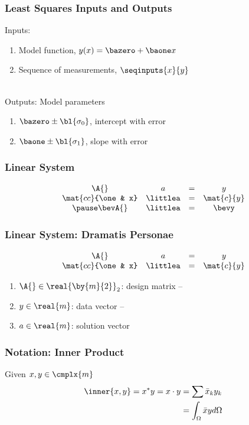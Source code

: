 \begin{frame}\frametitle{Least Squares Inputs and Outputs}
Inputs: \\
%
\begin{enumerate}
	\item Model function, $y(x) = \bazero + \baone x$
	\item Sequence of measurements, $\seqinputs{x}{y}$
\end{enumerate}
	\ \\[10pt]
	\pause
Outputs: Model parameters\\
\begin{enumerate}
	\item $\bazero \pm \bl{\sigma_{0}}$, intercept with error
	\item $\baone \pm \bl{\sigma_{1}}$, slope with error
\end{enumerate}
\end{frame}
%
\begin{frame}\frametitle{Linear System}
\begin{equation}
	\begin{array}{ccccc cccc}
		\A{} & a & = & y \\
		\mat{cc}{\one & x} & \littlea & = & \mat{c}{y}\\
		\pause
		\bevA{} & \littlea & = & \bevy 
	\end{array}
\label{eq:bevington normal equations problem and solution}
\end{equation}
\end{frame}
%
%
\begin{frame}\frametitle{Linear System: Dramatis Personae}
\begin{equation}
	\begin{array}{cccc}
		\A{} & a & = & y \\
		\mat{cc}{\one & x} & \littlea & = & \mat{c}{y}\\
	\end{array}
\label{eq:Dramatis Personae}
\end{equation}
\begin{enumerate}
	\item $\A{}\in\real{\by{m}{2}}_{2}$: design matrix -- 
	\item $y\in\real{m}$: data vector -- 
	\item $a\in\real{m}$: solution vector
\end{enumerate}
\end{frame}
%
\begin{frame}\frametitle{Notation: Inner Product}
Given $x, y \in \cmplx{m}$
\begin{equation}
\begin{split}
	\inner{x, y} = x^{*}y = x \cdot y 
		&= \sum \bar{x}_{k}y_{k} \\
		&= \int_{\Omega} \bar{x} y d\Omega
\end{split}
\end{equation}
\end{frame}
